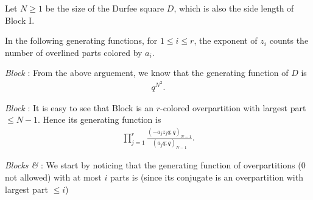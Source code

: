 \documentclass[12pt,reqno]{amsart}
\numberwithin{equation}{section}
\theoremstyle{plain}
\theoremstyle{definition}
\begin{document}
Let $N\ge 1$ be the size of the Durfee square $D$, which is also the side length of Block I.

In the following generating functions, for $1\le i\le r$, the exponent of $z_i$ counts the number of overlined parts colored by $a_i$.





























































\emph{Block \uppercase\expandafter{}}: From the above arguement, we know that the generating function of $D$ is
\begin{align}
q^{N^{2}}.
\end{align}

\emph{Block \uppercase\expandafter{}}: It is easy to see that Block \uppercase\expandafter{} is an $r$-colored overpartition with largest part $\le N-1$. Hence its generating function is
\begin{align}
\prod_{j=1}^{r}\frac{(-a_{j} z_j q;q)_{N-1}}{(a_{j}q;q)_{N-1}}.
\end{align}

\emph{Blocks \uppercase\expandafter{} \& \uppercase\expandafter{}}: We start by noticing that the generating function of overpartitions ($0$ not allowed) with at most $i$ parts is (since its conjugate is an overpartition with largest part $\le i$)
\end{document}

